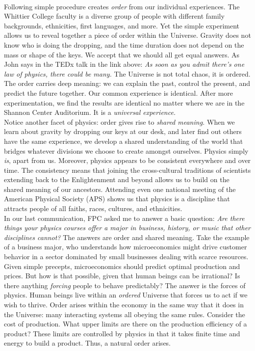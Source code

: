 \documentclass[../../../main.tex]{subfiles}
\begin{document}
\\
\vspace{0.25cm}
Following simple procedure creates \textit{order} from our individual experiences.  The Whittier College faculty is a diverse group of people with different family backgrounds, ethnicities, first languages, and more.  Yet the simple experiment allows us to reveal together a piece of order within the Universe.  Gravity does not know who is doing the dropping, and the time duration does not depend on the mass or shape of the keys.  We accept that we should all get equal answers.  As John says in the TEDx talk in the link above: \textit{As soon as you admit there's one law of physics, there could be many.}  The Universe is not total chaos, it is ordered.  The order carries deep meaning: we can explain the past, control the present, and predict the future together.  Our common experience is identical.  After more experimentation, we find the results are identical no matter where we are in the Shannon Center Auditorium.  It is a \textit{universal experience.}
\\
\vspace{0.25cm}
Notice another facet of physics: order gives rise to \textit{shared meaning.}  When we learn about gravity by dropping our keys at our desk, and later find out others have the same experience, we develop a shared understanding of the world that bridges whatever divisions we choose to create amongst ourselves.  Physics simply \textit{is}, apart from us.  Moreover, physics appears to be consistent everywhere and over time.  The consistency means that joining the cross-cultural traditions of scientists extending back to the Enlightenment and beyond allows us to build on the shared meaning of our ancestors.  Attending even one national meeting of the American Physical Society (APS) shows us that physics is a discipline that attracts people of all faiths, races, cultures, and ethnicities.
\\
\vspace{0.25cm}
In our last communication, FPC asked me to answer a basic question: \textit{Are there things your physics courses offer a major in business, history, or music that other disciplines cannot?}  The answers are order and shared meaning.  Take the example of a business major, who understands how microeconomics might drive customer behavior in a sector dominated by small businesses dealing with scarce resources.  Given simple precepts, microeconomics should predict optimal production and prices.  But how is that possible, given that human beings can be irrational?  Is there anything \textit{forcing} people to behave predictably?  The answer is the forces of physics.  Human beings live within an \textit{ordered} Universe that forces us to act if we wish to thrive.  Order arises within the economy in the same way that it does in the Universe: many interacting systems all obeying the same rules.  Consider the cost of production.  What upper limits are there on the production efficiency of a product?  These limits are controlled by physics in that it takes finite time and energy to build a product.  Thus, a natural order arises.
\end{document}

